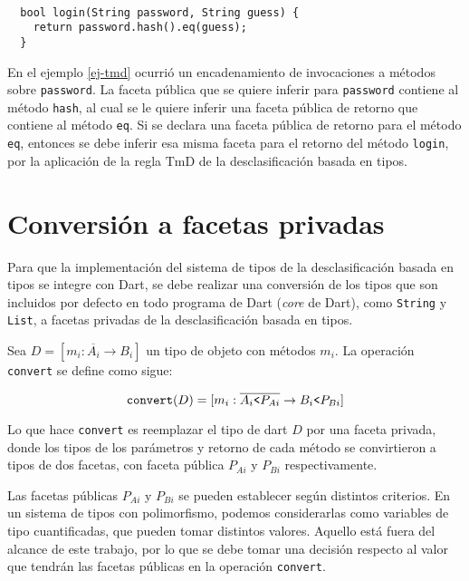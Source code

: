 \begin{ej} \ \\
  \label{ej-tmd}
  \normalfont
\begin{lstlisting}
  bool login(String password, String guess) {
    return password.hash().eq(guess);
  }
\end{lstlisting}
\end{ej}

En el ejemplo \ref{ej-tmd} ocurrió un encadenamiento de invocaciones a métodos sobre \texttt{password}. La faceta pública que se quiere inferir para \texttt{password} contiene al método \texttt{hash}, al cual se le quiere inferir una faceta pública de retorno que contiene al método \texttt{eq}. Si se declara una faceta pública de retorno para el método \texttt{eq}, entonces se debe inferir esa misma faceta para el retorno del método \texttt{login}, por la aplicación de la regla $\text{TmD}$ de la desclasificación basada en tipos.

\section{Conversión a facetas privadas} \label{conv}
Para que la implementación del sistema de tipos de la desclasificación basada en tipos se integre con Dart, se debe realizar una conversión de los tipos que son incluidos por defecto en todo programa de Dart (\emph{core} de Dart), como \texttt{String} y \texttt{List}, a facetas privadas de la desclasificación basada en tipos.

Sea $D = [m_i: \overline{A_i} \rightarrow B_i]$ un tipo de objeto con métodos $m_i$. La operación \texttt{convert} se define como sigue:

\[
\mathtt{convert}(D) = [m_i: \overline{A_i\text{\texttt{<}}P_{Ai}} \rightarrow B_i\text{\texttt{<}}P_{Bi}]
\]

Lo que hace \texttt{convert} es reemplazar el tipo de dart $D$ por una faceta privada, donde los tipos de los parámetros y retorno de cada método se convirtieron a tipos de dos facetas, con faceta pública $P_{Ai}$ y $P_{Bi}$ respectivamente.

Las facetas públicas $P_{Ai}$ y $P_{Bi}$ se pueden establecer según distintos criterios. En un sistema de tipos con polimorfismo, podemos considerarlas como variables de tipo cuantificadas, que pueden tomar distintos valores. Aquello está fuera del alcance de este trabajo, por lo que se debe tomar una decisión respecto al valor que tendrán las facetas públicas en la operación \texttt{convert}.

